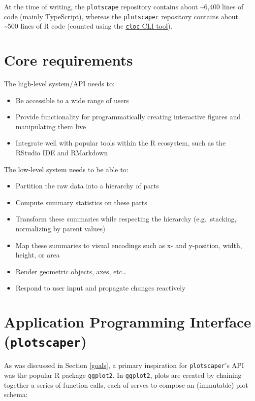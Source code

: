 \documentclass[
]{book}
\providecommand{\tightlist}{%
  \setlength{\itemsep}{0pt}\setlength{\parskip}{0pt}}
\theoremstyle{definition}
\theoremstyle{definition}
\theoremstyle{definition}
\theoremstyle{definition}
\theoremstyle{remark}
\begin{document}
At the time of writing, the \texttt{plotscape} repository contains about \textasciitilde6,400 lines of code (mainly TypeScript), whereas the \texttt{plotscaper} repository contains about \textasciitilde500 lines of R code (counted using the \href{https://github.com/AlDanial/cloc}{\texttt{cloc} CLI tool}).

\section{Core requirements}\label{core-requirements}

The high-level system/API needs to:

\begin{itemize}
\tightlist
\item
  Be accessible to a wide range of users
\item
  Provide functionality for programmatically creating interactive figures and manipulating them live
\item
  Integrate well with popular tools within the R ecosystem, such as the RStudio IDE and RMarkdown
\end{itemize}

The low-level system needs to be able to:

\begin{itemize}
\tightlist
\item
  Partition the raw data into a hierarchy of parts
\item
  Compute summary statistics on these parts
\item
  Transform these summaries while respecting the hierarchy (e.g.~stacking, normalizing by parent values)
\item
  Map these summaries to visual encodings such as x- and y-position, width, height, or area
\item
  Render geometric objects, axes, etc\ldots{}
\item
  Respond to user input and propagate changes reactively
\end{itemize}

\section{\texorpdfstring{Application Programming Interface (\texttt{plotscaper})}{Application Programming Interface (plotscaper)}}\label{application-programming-interface-plotscaper}

As was discussed in Section \ref{goals}, a primary inspiration for \texttt{plotscaper}'s API was the popular R package \texttt{ggplot2}. In \texttt{ggplot2}, plots are created by chaining together a series of function calls, each of serves to compose an (immutable) plot schema:
\end{document}
